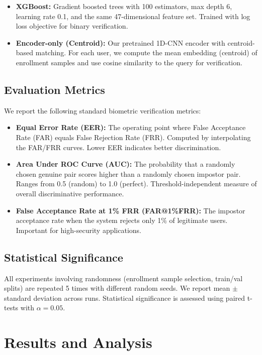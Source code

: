 \documentclass{ieeeaccess}
\begin{document}
{\begin{itemize}
\item \textbf{XGBoost:} Gradient boosted trees with 100 estimators, max depth 6, learning rate 0.1, and the same 47-dimensional feature set. Trained with log loss objective for binary verification.

\item \textbf{Encoder-only (Centroid):} Our pretrained 1D-CNN encoder with centroid-based matching. For each user, we compute the mean embedding (centroid) of enrollment samples and use cosine similarity to the query for verification.
\end{itemize}

\subsection{Evaluation Metrics}
We report the following standard biometric verification metrics:

\begin{itemize}
\item \textbf{Equal Error Rate (EER):} The operating point where False Acceptance Rate (FAR) equals False Rejection Rate (FRR). Computed by interpolating the FAR/FRR curves. Lower EER indicates better discrimination.

\item \textbf{Area Under ROC Curve (AUC):} The probability that a randomly chosen genuine pair scores higher than a randomly chosen impostor pair. Ranges from 0.5 (random) to 1.0 (perfect). Threshold-independent measure of overall discriminative performance.

\item \textbf{False Acceptance Rate at 1\% FRR (FAR@1\%FRR):} The impostor acceptance rate when the system rejects only 1\% of legitimate users. Important for high-security applications.
\end{itemize}

\subsection{Statistical Significance}
All experiments involving randomness (enrollment sample selection, train/val splits) are repeated 5 times with different random seeds. We report mean $\pm$ standard deviation across runs. Statistical significance is assessed using paired t-tests with $\alpha = 0.05$.

\section{Results and Analysis}
\label{sec:results}

}
\end{document}
